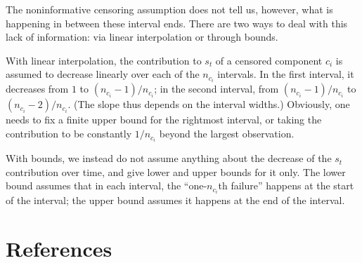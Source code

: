 \documentclass[12pt, a4paper]{elsarticle}
\begin{document}
The noninformative censoring assumption does not tell us, however,
what is happening in between these interval ends.
There are two ways to deal with this lack of information:
via linear interpolation or through bounds.

With linear interpolation, the contribution to $s_t$ of a censored component $c_i$ 
is assumed to decrease linearly over each of the $n_{c_i}$ intervals.
In the first interval, it decreases from $1$ to $(n_{c_i} - 1)/n_{c_i}$;
in the second interval, from $(n_{c_i} - 1)/n_{c_i}$ to $(n_{c_i} - 2)/n_{c_i}$.
(The slope thus depends on the interval widths.)
Obviously, one needs to fix a finite upper bound for the rightmost interval,
or taking the contribution to be constantly $1/n_{c_i}$ beyond the largest observation.

With bounds, we instead do not assume anything about the decrease
of the $s_t$ contribution over time,
and give lower and upper bounds for it only.
The lower bound assumes that in each interval,
the ``one-$n_{c_i}$th failure'' happens at the start of the interval;
the upper bound assumes it happens at the end of the interval.








\section*{References}



\end{document}
